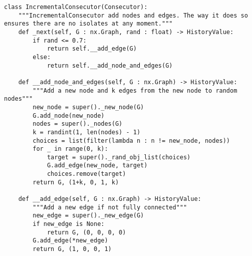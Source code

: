 \begin{lstlisting}[label={code:incremental_consecutor}, caption={Incremental Consecutor}]
class IncrementalConsecutor(Consecutor):
	"""IncrementalConsecutor add nodes and edges. The way it does so ensures there are no isolates at any moment."""
	def _next(self, G : nx.Graph, rand : float) -> HistoryValue:
		if rand <= 0.7:
			return self.__add_edge(G)
		else:
			return self.__add_node_and_edges(G)
	
	def __add_node_and_edges(self, G : nx.Graph) -> HistoryValue:
		"""Add a new node and k edges from the new node to random nodes"""
		new_node = super()._new_node(G)
		G.add_node(new_node)
		nodes = super()._nodes(G)
		k = randint(1, len(nodes) - 1)
		choices = list(filter(lambda n : n != new_node, nodes))
		for _ in range(0, k):
			target = super()._rand_obj_list(choices)
			G.add_edge(new_node, target)
			choices.remove(target)
		return G, (1+k, 0, 1, k)
	
	def __add_edge(self, G : nx.Graph) -> HistoryValue:
		"""Add a new edge if not fully connected"""
		new_edge = super()._new_edge(G)
		if new_edge is None:
			return G, (0, 0, 0, 0)
		G.add_edge(*new_edge)
		return G, (1, 0, 0, 1)
\end{lstlisting}